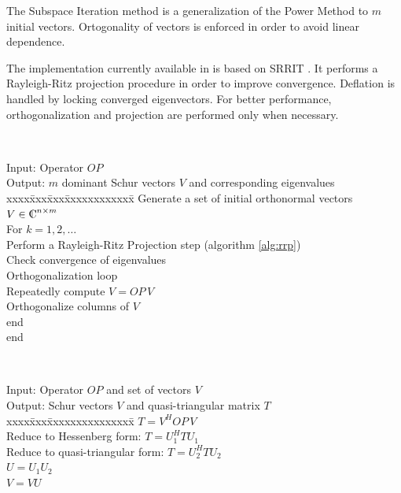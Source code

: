 The Subspace Iteration method is a generalization of the Power Method to $m$ initial vectors. Ortogonality of vectors is enforced in order to avoid linear dependence.

The implementation currently available in \slepc is based on SRRIT \citep{Bai:1997:ASF}. It performs a Rayleigh-Ritz projection procedure in order to improve convergence. Deflation is handled by locking converged eigenvectors. For better performance, orthogonalization and projection are performed only when necessary.

\begin{algorithm}~\rm
\begin{tabbing}
Input: Operator $O\!P$ \\
Output: $m$ dominant Schur vectors $V$ and corresponding eigenvalues\\
xxxx\=xxx\=xxx\=xxxxxxxxxxxx\=\kill
\> Generate a set of initial orthonormal vectors $V\in\Co^{n\times m}$\\
\> For $k=1,2,\ldots$\\
\> \> Perform a Rayleigh-Ritz Projection step (algorithm \ref{alg:rrp})\\
\> \> Check convergence of eigenvalues \\
\> \> Orthogonalization loop \\
\> \> \> Repeatedly compute $V = O\!P\, V$ \\
\> \> \> Orthogonalize columns of $V$ \\
\> \> end \\
\> end
\end{tabbing}
\end{algorithm}

\begin{algorithm}~\rm
\begin{tabbing}
Input: Operator $O\!P$ and set of vectors $V$\\
Output: Schur vectors $V$ and quasi-triangular matrix $T$ \\
xxxx\=xxx\=xxxxxxxxxxxxxxx\=\kill
\> $T=V^H O\!P\, V$ \\
\> Reduce to Hessenberg form: $T=U_1^HTU_1$ \\
\> Reduce to quasi-triangular form: $T=U_2^HTU_2$ \\
\> $U=U_1U_2$ \\
\> $V=VU$ 
\end{tabbing}
\end{algorithm}

